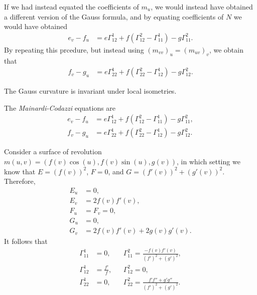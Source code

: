\begin{rmk}
    If we had instead equated the coefficients of $m_u$, we would instead have obtained a different version of the Gauss formula, and by equating coefficients of $N$ we would have obtained
    \begin{align*}
        e_v - f_u &= e\Gamma_{12}^{1} + f\left(\Gamma_{12}^{2} - \Gamma_{11}^{1}\right) - g\Gamma_{11}^2.
    \end{align*}
    By repeating this prcedure, but instead using $(m_{vv})_u = (m_{uv})_v$, we obtain that
    \begin{align*}
        f_v - g_u &= e\Gamma_{22}^{1} + f(\Gamma_{22}^{2} - \Gamma_{12}^{1}) - g\Gamma_{12}^{2}.
    \end{align*}
\end{rmk}

\begin{cor}
    The Gauss curvature is invariant under local isometries.
\end{cor}

\begin{defn}
    The \emph{Mainardi-Codazzi} equations are
    \begin{align*}
        e_v - f_u &= e\Gamma_{12}^{1} + f\left(\Gamma_{12}^{2}-\Gamma_{11}^{1}\right) - g\Gamma_{11}^2, \\
        f_v - g_u &= e\Gamma_{22}^{1} + f\left(\Gamma_{22}^{2}-\Gamma_{12}^{1}\right) - g\Gamma_{12}^2.
    \end{align*}
\end{defn}

\begin{exmp}
    Consider a surface of revolution $m(u, v) = (f(v)\cos(u), f(v)\sin(u), g(v))$, in which setting we know that $E = (f(v))^2$, $F = 0$, and $G = (f'(v))^2 + (g'(v))^2$. Therefore,
    \begin{align*}
        E_u &= 0, \\
        E_v &= 2f(v)f'(v), \\
        F_u &= F_v = 0, \\
        G_u &= 0, \\
        G_v &= 2f(v)f'(v) + 2g(v)g'(v).
    \end{align*}
    It follows that
    \begin{align*}
        \Gamma_{11}^{1} &= 0, &&\Gamma_{11}^{2} = \frac{-f(v)f'(v)}{(f')^2 + (g')^2}, \\
        \Gamma_{12}^{1} &= \frac{f'}{f}, &&\Gamma_{12}^{2} = 0, \\
        \Gamma_{22}^{1} &= 0, &&\Gamma_{22}^{2} = \frac{f'f'' + g'g''}{(f')^2 + (g')^2}.
    \end{align*}
\end{exmp}

